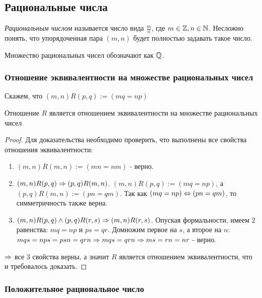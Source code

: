 \subsection{Рациональные числа}

\begin{definition}
    \textit{Рациональным числом} называется число вида $\frac{m}{n}$, где $m \in \mathbb{Z}, n \in \mathbb{N}$. Несложно понять, что упорядоченная пара $(m, n)$ будет полностью задавать такое число.
    
    Множество рациональных чисел обозначают как $\mathbb{Q}$.
\end{definition}

\subsubsection*{Отношение эквивалентности на множестве рациональных чисел}

\begin{definition}
    Скажем, что $(m, n)R(p, q) := (mq = np)$
\end{definition}

\begin{proposition}
    Отношение $R$ является отношением эквивалентности на множестве рациональных чисел
\end{proposition}

\begin{proof}
    Для доказательства необходимо проверить, что выполнены все свойства отношения эквивалентности:
    \begin{enumerate}
        \item $(m, n)R(m, n) := (mn = nm)$ - верно.
        \item $(m, n)R(p, q) \Rightarrow (p, q)R(m, n)$. $(m, n)R(p, q) := (mq = np)$, а $(p, q)R(m, n) := (pn = qm)$. Так как $(mq = np) \Leftrightarrow (pn = qm)$, то симметричность также верна.
        \item $(m, n)R(p, q) \wedge (p, q)R(r, s) \Rightarrow (m, n)R(r, s)$. Опуская формальности, имеем $2$ равенства: $mq = np$ и $ps = qr$. Домножим первое на $s$, а второе на $n$: $mqs = nps = psn = qrn \Rightarrow mqs = qrn \Rightarrow ms = rn = nr$ - верно.
    \end{enumerate}
    $\Rightarrow$ все $3$ свойства верны, а значит $R$ является отношением эквивалентности, что и требовалось доказать.
\end{proof}

\subsubsection*{Положительное рациональное число}

